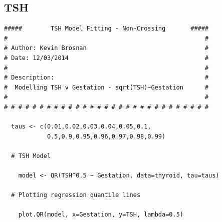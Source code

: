 \documentclass[12pt,a4paper]{report}
\begin{document}
\subsection*{TSH}
\begin{lstlisting}
#####        TSH Model Fitting - Non-Crossing       #####
#                                                       #
# Author: Kevin Brosnan                                 #
# Date: 12/03/2014                                      #
#                                                       #
# Description:                                          #
#  Modelling TSH v Gestation - sqrt(TSH)~Gestation      #
#                                                       #
# # # # # # # # # # # # # # # # # # # # # # # # # # # # #

  taus <- c(0.01,0.02,0.03,0.04,0.05,0.1,
            0.5,0.9,0.95,0.96,0.97,0.98,0.99)

  # TSH Model

    model <- QR(TSH^0.5 ~ Gestation, data=thyroid, tau=taus)

  # Plotting regression quantile lines

    plot.QR(model, x=Gestation, y=TSH, lambda=0.5)
\end{lstlisting}
\end{document}
